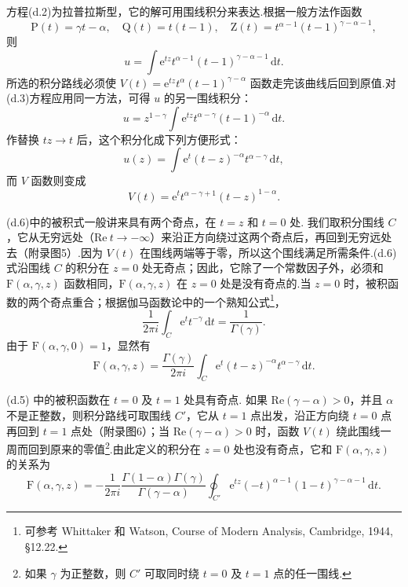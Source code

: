 方程(d.2)为拉普拉斯型，它的解可用围线积分来表达.根据一般方法作函数
\begin{equation*}
  \mathrm{P}(t)=\gamma t-\alpha,\quad
  \mathrm{Q}(t)=t(t-1),\quad
  \mathrm{Z}(t)=t^{\alpha-1}(t-1)^{\gamma-\alpha-1},
\end{equation*}
则
\begin{equation}
  u=\int\mathrm{e}^{tz}t^{\alpha-1}(t-1)^{\gamma-\alpha-1}\,\mathrm{d}t.
\end{equation}
所选的积分路线必须使 $V(t)=\mathrm{e}^{tz}t^{\alpha}(t-1)^{\gamma-\alpha}$ 函数走完该曲线后回到原值.对(d.3)方程应用同一方法，可得 $u$ 的另一围线积分：
\begin{equation*}
  u=z^{1-\gamma}\int\mathrm{e}^{tz}t^{\alpha-\gamma}(t-1)^{-\alpha}\,\mathrm{d}t.
\end{equation*}
作替换 $tz\to t$ 后，这个积分化成下列方便形式：
\begin{equation}
  u(z)=\int\mathrm{e}^t(t-z)^{-\alpha}t^{\alpha-\gamma}\,\mathrm{d}t,
\end{equation}
而 $V$ 函数则变成
\begin{equation*}
  V(t)=\mathrm{e}^tt^{\alpha-\gamma+1}(t-z)^{1-\alpha}.
\end{equation*}

(d.6)中的被积式一般讲来具有两个奇点，在 $t=z$ 和 $t=0$ 处. 我们取积分围线 $C$，它从无穷远处（$\mathrm{Re}\ t\to-\infty$）来沿正方向绕过这两个奇点后，再回到无穷远处去（附录图5）.因为 $V(t)$ 在围线两端等于零，所以这个围线满足所需条件.(d.6)式沿围线 $C$ 的积分在 $z=0$ 处无奇点；因此，它除了一个常数因子外，必须和 $\mathrm{F}(\alpha,\gamma,z)$ 函数相同，$\mathrm{F}(\alpha,\gamma,z)$ 在 $z=0$ 处是没有奇点的.当 $z=0$ 时，被积函数的两个奇点重合；根据伽马函数论中的一个熟知公式\footnote{可参考 Whittaker 和 Watson, Course of Modern Analysis, Cambridge, 1944, §12.22.}，
\begin{equation}
  \frac{1}{2\pi i}\int_C\mathrm{e}^tt^{-\gamma}\,\mathrm{d}t=\frac{1}{\Gamma(\gamma)}.
\end{equation}
由于 $\mathrm{F}(\alpha,\gamma,0)=1$，显然有
\begin{equation}
  \mathrm{F}(\alpha,\gamma,z)=\frac{\Gamma(\gamma)}{2\pi i}\int_C
  \mathrm{e}^t(t-z)^{-\alpha}t^{\alpha-\gamma}\,\mathrm{d}t.
\end{equation}

(d.5) 中的被积函数在 $t=0$ 及 $t=1$ 处具有奇点. 如果 $\mathrm{Re}(\gamma-\alpha)>0$，并且 $\alpha$ 不是正整数，则积分路线可取围线 $C'$，它从 $t=1$ 点出发，沿正方向绕 $t=0$ 点再回到 $t=1$ 点处（附录图6）；当 $\mathrm{Re}(\gamma-\alpha)>0$ 时，函数 $V(t)$ 绕此围线一周而回到原来的零值\footnote{如果 $\gamma$ 为正整数，则 $C'$ 可取同时绕 $t=0$ 及 $t=1$ 点的任一围线.}.由此定义的积分在 $z=0$ 处也没有奇点，它和 $\mathrm{F}(\alpha,\gamma,z)$ 的关系为
\begin{equation}
  \mathrm{F}(\alpha,\gamma,z)=-\frac{1}{2\pi i}
  \frac{\Gamma(1-\alpha)\Gamma(\gamma)}{\Gamma(\gamma-\alpha)}
  \oint_{C'}\mathrm{e}^{tz}(-t)^{\alpha-1}(1-t)^{\gamma-\alpha-1}\,\mathrm{d}t.
\end{equation}

